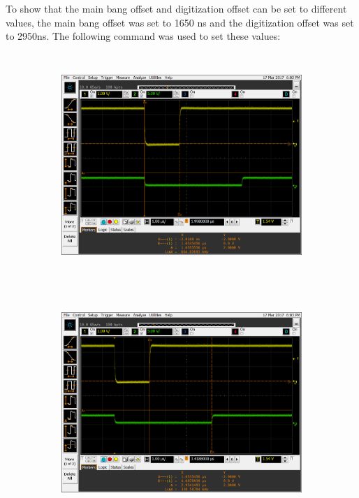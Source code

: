 \documentclass[12pt, a4paper]{article}
\begin{document}
To show that the main bang offset and digitization offset can be set to different values, the main bang offset was set to 1650 ns and the digitization offset was set to 2950ns. The following command was used to set these values:

		

	\begin{figure}[t]
   		\begin{subfigure}[t]{13.5cm}
   			\includegraphics[width=13cm,height=8.5cm]{1khz_mb_1650ns_mb_offset}
   			\caption{}
   			\label{fig:var_offsets_1650} 
		\end{subfigure}

		\begin{subfigure}[t]{13.5cm}
   			\includegraphics[width=13cm,height=8.5cm]{1khz_mb_2950ns_d_offset}
   			\caption{}
   		\label{fig:var_offsets_2950}
		\end{subfigure}


\end{figure}
\end{document}
